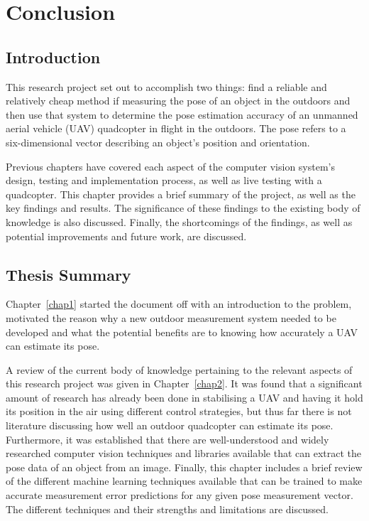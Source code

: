 \chapter{Conclusion}
\label{chap6}

\section{Introduction}

This research project set out to accomplish two things: find a reliable and relatively cheap method if measuring the pose of an object in the outdoors and then use that system to determine the pose estimation accuracy of an unmanned aerial vehicle (UAV) quadcopter in flight in the outdoors. The pose refers to a six-dimensional vector describing an object's position and orientation. 

Previous chapters have covered each aspect of the computer vision system's design, testing and implementation process, as well as live testing with a quadcopter. This chapter provides a brief summary of the project, as well as the key findings and results. The significance of these findings to the existing body of knowledge is also discussed. Finally, the shortcomings of the findings, as well as potential improvements and future work, are discussed. 

\section{Thesis Summary}

Chapter~\ref{chap1} started the document off with an introduction to the problem, motivated the reason why a new outdoor measurement system needed to be developed and what the potential benefits are to knowing how accurately a UAV can estimate its pose.  

A review of the current body of knowledge pertaining to the relevant aspects of this research project was given in Chapter~\ref{chap2}. It was found that a significant amount of research has already been done in stabilising a UAV and having it hold its position in the air using different control strategies, but thus far there is not literature discussing how well an outdoor quadcopter can estimate its pose. Furthermore, it was established that there are well-understood and widely researched computer vision techniques and libraries available that can extract the pose data of an object from an image. Finally, this chapter includes a brief review of the different machine learning techniques available that can be trained to make accurate measurement error predictions for any given pose measurement vector. The different techniques and their strengths and limitations are discussed.  


